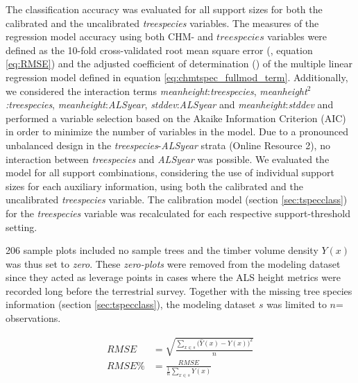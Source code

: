  The classification accuracy was evaluated for all support sizes for both the calibrated and the uncalibrated \textit{treespecies} variables. The measures of the regression model accuracy using both CHM- and $treespecies$ variables were defined as the 10-fold cross-validated root mean square error (\rmsecv{}, equation \ref{eq:RMSE}) and the adjusted coefficient of determination (\adjrsq{}) of the multiple linear regression model defined in equation \ref{eq:chmtspec_fullmod_term}. Additionally, we considered the interaction terms \textit{meanheight}:\textit{treespecies}, \textit{meanheight$^{2}$:treespecies}, \textit{meanheight}:\textit{ALSyear}, \textit{stddev}:\textit{ALSyear} and \textit{meanheight}:\textit{stddev} and performed a variable selection based on the Akaike Information Criterion (AIC) \citep{Akaike2011} in order to minimize the number of variables in the model. Due to a pronounced unbalanced design in the \textit{treespecies}-\textit{ALSyear} strata (Online Resource 2), no interaction between \textit{treespecies} and \textit{ALSyear} was possible. We evaluated the model for all support combinations, considering the use of individual support sizes for each auxiliary information, using both the calibrated and the uncalibrated \textit{treespecies} variable. The calibration model (section \ref{sec:tspecclass}) for the \textit{treespecies} variable was recalculated for each respective support-threshold setting.\par

206 sample plots included no sample trees and the timber volume density $Y(x)$ was thus set to \textit{zero}. These \textit{zero-plots} were removed from the modeling dataset since they acted as leverage points in cases where the ALS height metrics were recorded long before the terrestrial survey. Together with the missing tree species information (section \ref{sec:tspecclass}), the modeling dataset $s$ was limited to $n$= observations.

\begin{subequations}\label{eq:RMSE}
	\begin{align}
	RMSE &= \sqrt{\frac{\sum_{x \in s}\big(\hat{Y}(x)-Y(x)\big)^2}{n}} \label{eq:RMSEa}\\
	RMSE\% &= \frac{RMSE}{\frac{1}{n}\sum_{x \in s}Y(x)}	\label{eq:RMSEb}
	\end{align}
\end{subequations}


